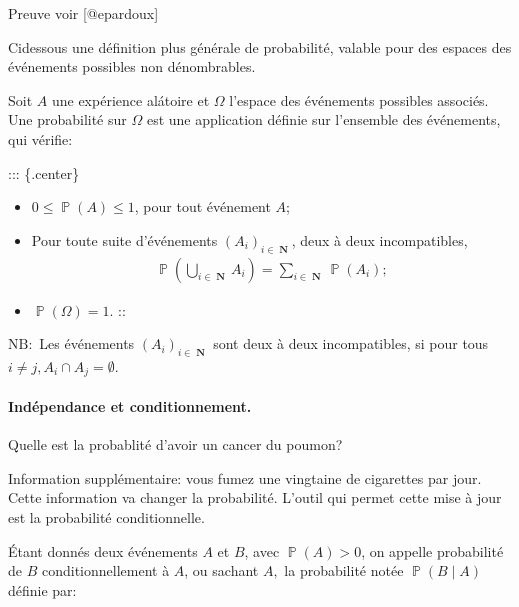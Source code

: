 \documentclass[letterpaper,11pt,english]{sphinxmanual}
\begin{document}
\begin{DUlineblock}{0em}
\item[] Preuve voir {[}@epardoux{]}
\item[] Ci\sphinxhyphen{}dessous une définition plus générale de probabilité, valable pour
des espaces des événements possibles non dénombrables.
\item[]  Soit \(A\) une expérience alátoire et
\(\Omega\) l’espace des événements possibles associés. Une
probabilité sur \(\Omega\) est une application définie sur
l’ensemble des événements, qui vérifie:
\end{DUlineblock}

\sphinxAtStartPar
::: \{.center\}
\begin{itemize}
\item {} 
\sphinxAtStartPar
{} \(0\leq \operatorname{\mathbb{P}}(A)\leq 1\), pour
tout événement \(A\);

\item {} 
\sphinxAtStartPar
{} Pour toute suite d’événements
\((A_i)_{i\in \operatorname{\mathbf{N}}}\), deux à deux
incompatibles,
\begin{equation}\label{equation:chapter2:chapter2:34}
\begin{split}\operatorname{\mathbb{P}}\left(\bigcup_{i \in \operatorname{\mathbf{N}}} A_{i}\right)=\sum_{i \in \operatorname{\mathbf{N}}} \operatorname{\mathbb{P}}\left(A_{i}\right);\end{split}
\end{equation}
\item {} 
\sphinxAtStartPar
{} \(\operatorname{\mathbb{P}}(\Omega) = 1.\) ::

\end{itemize}

\sphinxAtStartPar
\(\mathrm{NB}:\) Les événements
\(\left(A_{i}\right)_{i \in \operatorname{\mathbf{N}}}\) sont deux à
deux incompatibles, si pour tous
\(i \neq j, A_{i} \cap A_{j}=\emptyset\).


\paragraph{Indépendance et conditionnement.}
\label{\detokenize{chapter2:independance-et-conditionnement}}
\begin{DUlineblock}{0em}
\item[] 
\item[] Quelle est la probablité d’avoir un cancer du poumon?
\item[] Information supplémentaire: vous fumez une vingtaine de cigarettes par
jour. Cette information va changer la probabilité. L’outil qui permet
cette mise à jour est la probabilité conditionnelle.
\item[] 
\item[] Étant donnés deux événements \(A\) et \(B\), avec
\(\operatorname{\mathbb{P}}(A) > 0\), on appelle probabilité de
\(B\) conditionnellement à \(A\), ou sachant \(A,\) la
probabilité notée \(\operatorname{\mathbb{P}}(B \mid A)\) définie
par:
\end{DUlineblock}
\end{document}
